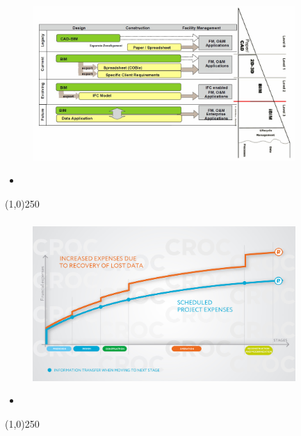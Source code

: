 \begin{frame}
\frametitle{}
\begin{figure}
	\centering
	\includegraphics[width=10cm]{./images/COBie-levels.jpg}
	\caption[]{}
	\label{fig:}
\end{figure}
\begin{itemize}
	\item 
\end{itemize}
\end{frame}
\begin{center}\line(1,0){250}\end{center}



\begin{frame}
\frametitle{}
\begin{figure}
	\centering
	\includegraphics[width=10cm]{./images/InformationTransferCost.jpg}
	\caption[]{}
	\label{fig:}
\end{figure}
\begin{itemize}
	\item 
\end{itemize}
\end{frame}
\begin{center}\line(1,0){250}\end{center}





